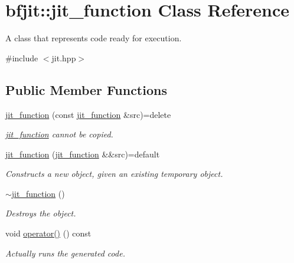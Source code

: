 \hypertarget{classbfjit_1_1jit__function}{}\section{bfjit\+:\+:jit\+\_\+function Class Reference}
\label{classbfjit_1_1jit__function}


A class that represents code ready for execution.  




{\ttfamily \#include $<$jit.\+hpp$>$}

\subsection*{Public Member Functions}
\begin{DoxyCompactItemize}
\item 
\hypertarget{classbfjit_1_1jit__function_af1fc2ce0a88008b14b83af58850ba986}{}\label{classbfjit_1_1jit__function_af1fc2ce0a88008b14b83af58850ba986} 
\hyperlink{classbfjit_1_1jit__function_af1fc2ce0a88008b14b83af58850ba986}{jit\+\_\+function} (const \hyperlink{classbfjit_1_1jit__function}{jit\+\_\+function} \&src)=delete
\begin{DoxyCompactList}\small\item\em \hyperlink{classbfjit_1_1jit__function}{jit\+\_\+function} cannot be copied. \end{DoxyCompactList}\item 
\hypertarget{classbfjit_1_1jit__function_a5d0022ddb357ff4671fd7b531a6a50c8}{}\label{classbfjit_1_1jit__function_a5d0022ddb357ff4671fd7b531a6a50c8} 
\hyperlink{classbfjit_1_1jit__function_a5d0022ddb357ff4671fd7b531a6a50c8}{jit\+\_\+function} (\hyperlink{classbfjit_1_1jit__function}{jit\+\_\+function} \&\&src)=default
\begin{DoxyCompactList}\small\item\em Constructs a new object, given an existing temporary object. \end{DoxyCompactList}\item 
\hypertarget{classbfjit_1_1jit__function_a01b04a52531720d33b15710f9439175b}{}\label{classbfjit_1_1jit__function_a01b04a52531720d33b15710f9439175b} 
\hyperlink{classbfjit_1_1jit__function_a01b04a52531720d33b15710f9439175b}{$\sim$jit\+\_\+function} ()
\begin{DoxyCompactList}\small\item\em Destroys the object. \end{DoxyCompactList}\item 
\hypertarget{classbfjit_1_1jit__function_a656a098b23685e1d27b9257b2981a046}{}\label{classbfjit_1_1jit__function_a656a098b23685e1d27b9257b2981a046} 
void \hyperlink{classbfjit_1_1jit__function_a656a098b23685e1d27b9257b2981a046}{operator()} () const
\begin{DoxyCompactList}\small\item\em Actually runs the generated code. \end{DoxyCompactList}\end{DoxyCompactItemize}
